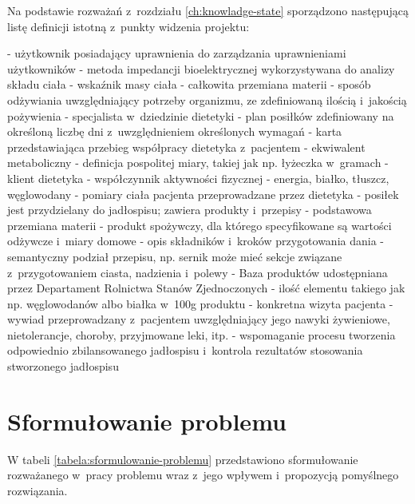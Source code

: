 Na podstawie rozważań z~rozdziału \ref{ch:knowladge-state} sporządzono następującą listę definicji istotną z~punkty widzenia projektu:
\begin{itemize}[series=atr, wide, align=left, leftmargin=190pt]
    - użytkownik posiadający uprawnienia do zarządzania uprawnieniami użytkowników
    - metoda impedancji bioelektrycznej wykorzystywana do analizy składu ciała
    - wskaźnik masy ciała
    - całkowita przemiana materii
    - sposób odżywiania uwzględniający potrzeby organizmu, ze zdefiniowaną ilością i~jakością pożywienia
    - specjalista w~dziedzinie dietetyki
    - plan posiłków zdefiniowany na określoną liczbę dni z~uwzględnieniem określonych wymagań
    - karta przedstawiająca przebieg współpracy dietetyka z~pacjentem
    - ekwiwalent metaboliczny
    - definicja pospolitej miary, takiej jak np. łyżeczka w~gramach
    - klient dietetyka
    - współczynnik aktywności fizycznej
    - energia, białko, tłuszcz, węglowodany
    - pomiary ciała pacjenta przeprowadzane przez dietetyka
    - posiłek jest przydzielany do jadłospisu; zawiera produkty i~przepisy
    - podstawowa przemiana materii
    - produkt spożywczy, dla którego specyfikowane są wartości odżywcze i~miary domowe
    - opis składników i~kroków przygotowania dania
    - semantyczny podział przepisu, np. sernik może mieć sekcje związane z~przygotowaniem ciasta, nadzienia i~polewy
    - Baza produktów udostępniana przez Departament Rolnictwa Stanów Zjednoczonych
    - ilość elementu takiego jak np. węglowodanów albo białka w~100g produktu
    - konkretna wizyta pacjenta
    - wywiad przeprowadzany z~pacjentem uwzględniający jego nawyki żywieniowe, nietolerancje, choroby, przyjmowane leki, itp.
    - wspomaganie procesu tworzenia odpowiednio zbilansowanego jadłospisu i~kontrola rezultatów stosowania stworzonego jadłospisu
\end{itemize}

\section{Sformułowanie problemu}\label{sec:problem-specification}

\par
W tabeli \ref{tabela:sformulowanie-problemu} przedstawiono sformułowanie rozważanego w~pracy problemu wraz z~jego wpływem i~propozycją pomyślnego rozwiązania.

